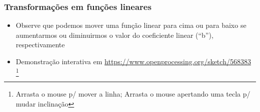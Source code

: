 \documentclass[usenames,dvipsnames,svgnames]{beamer}
\begin{document}
\begin{frame}
	\frametitle{Transformações em funções lineares}

	\begin{itemize}
		\item Observe que podemos mover uma função linear para cima ou para baixo se aumentarmos ou diminuirmos o valor do coeficiente linear (``b''), respectivamente
		\item Demonstração interativa em \url{https://www.openprocessing.org/sketch/568383} \footnote{Arrasta o mouse p/ mover a linha; Arrasta o mouse apertando uma tecla p/ mudar inclinação}
	\end{itemize}

	\begin{adjustbox}{max totalsize={\textwidth}{.55\textheight},center}
	\end{adjustbox}
\end{frame}
\end{document}

